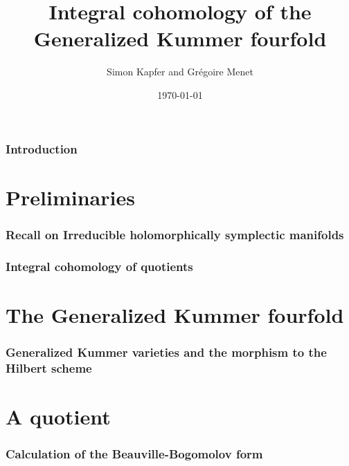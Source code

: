 \documentclass[a4paper]{article}
\begin{document}
\title{Integral cohomology of the Generalized Kummer fourfold}


\author{Simon Kapfer and Gr\'egoire Menet}


\date{\today}

\maketitle
\section{Introduction}
\part{Preliminaries}



\section{Recall on Irreducible holomorphically symplectic manifolds}
\section{Integral cohomology of quotients}

\part{The Generalized Kummer fourfold}
\section{Generalized Kummer varieties and the morphism to the Hilbert scheme}


\part{A quotient}
\section{Calculation of the Beauville-Bogomolov form}


\end{document}
